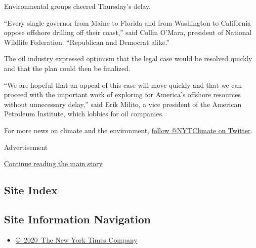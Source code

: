 Environmental groups cheered Thursday's delay.

``Every single governor from Maine to Florida and from Washington to
California oppose offshore drilling off their coast,'' said Collin
O'Mara, president of National Wildlife Federation. ``Republican and
Democrat alike.''

The oil industry expressed optimism that the legal case would be
resolved quickly and that the plan could then be finalized.

``We are hopeful that an appeal of this case will move quickly and that
we can proceed with the important work of exploring for America's
offshore resources without unnecessary delay,'' said Erik Milito, a vice
president of the American Petroleum Institute, which lobbies for oil
companies.

For more news on climate and the environment,
\href{https://twitter.com/nytclimate}{follow @NYTClimate on Twitter}.

Advertisement

\protect\hyperlink{after-bottom}{Continue reading the main story}

\hypertarget{site-index}{%
\subsection{Site Index}\label{site-index}}

\hypertarget{site-information-navigation}{%
\subsection{Site Information
Navigation}\label{site-information-navigation}}

\begin{itemize}
\tightlist
\item
  \href{https://help.nytimes3xbfgragh.onion/hc/en-us/articles/115014792127-Copyright-notice}{©~2020~The
  New York Times Company}
\end{itemize}

